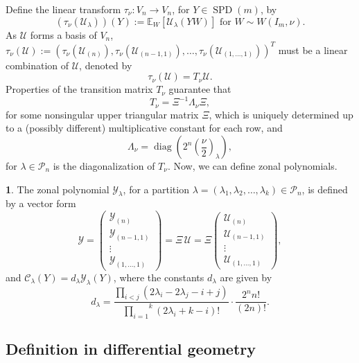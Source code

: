 \documentclass[10pt,oneside,american]{amsart}
\numberwithin{equation}{section}
\numberwithin{figure}{section}
\theoremstyle{plain}
\theoremstyle{definition}
\newtheorem{defn}[thm]{\protect\definitionname}
\theoremstyle{remark}
\theoremstyle{plain}
\theoremstyle{definition}
\theoremstyle{plain}
\theoremstyle{plain}
\DeclareMathOperator{\diag}{diag}
\newcommand{\SPD}{\operatorname{SPD}}
\providecommand{\definitionname}{Definition}
\begin{document}
Define the linear transform $\tau_{\nu}\colon V_{n}\longrightarrow V_{n}$,
for $Y\in \SPD(m)$, by
\[
  \left(\tau_{\nu}(\mathcal{U}_{\lambda})\right)\left(Y\right) :=
  \mathbb{E}_{W}\left[\mathcal{U}_{\lambda}(YW)\right]\text{ for }W\sim W(I_m,\nu).
\]
As $\mathcal{U}$ forms a basis of $V_{n}$, $\tau_{\nu}(\mathcal{U}):=\left(\tau_{\nu}(\mathcal{U}_{\left(n\right)}),\tau_{\nu}(\mathcal{U}_{\left(n-1,1\right)}),\ldots,\tau_{\nu}(\mathcal{U}_{\left(1,\ldots,1\right)})\right)^{T}$
must be a linear combination of $\mathcal{U}$,
denoted by 
\[
\tau_{\nu}(\mathcal{U})=T_{\nu}\mathcal{U}.
\]
Properties of the transition matrix $T_{\nu}$ guarantee that
\[
T_{\nu}=\Xi^{-1}\Lambda_{\nu}\Xi,
\]
for some nonsingular upper triangular matrix $\Xi$, which is uniquely
determined up to a (possibly different) multiplicative constant for
each row, and 
\[
\Lambda_{\nu}=\diag\left(2^{n}\left(\frac{\nu}{2}\right)_\lambda\right),
\]
for $\lambda\in\mathcal{P}_n$ is the diagonalization of $T_\nu$.
Now, we can define zonal polynomials.
\begin{defn}
The zonal polynomial $\mathcal{Y}_{\lambda}$, for a partition $\lambda=\left(\lambda_1,\lambda_2,\ldots,\lambda_k\right)\in\mathcal{P}_{n}$,
is defined by a vector form
\[
\mathcal{Y}=\left(\begin{matrix}\mathcal{Y}_{\left(n\right)}\\
\mathcal{Y}_{\left(n-1,1\right)}\\
\vdots\\
\mathcal{Y}_{\left(1,\ldots,1\right)}
\end{matrix}\right)=\Xi\,\mathcal{U}=\Xi\left(\begin{matrix}\mathcal{U}_{\left(n\right)}\\
\mathcal{U}_{\left(n-1,1\right)}\\
\vdots\\
\mathcal{U}_{\left(1,\ldots,1\right)}
\end{matrix}\right),
\]
and $\mathcal{C}_{\lambda}(Y)=d_{\lambda}\mathcal{Y}_{\lambda}(Y)$,
where the constants $d_\lambda$ are given by
\[
  d_{\lambda}=\frac{\underset{i<j}{\prod}\left(2\lambda_{i}-2\lambda_{j}-i+j\right)}{\overset{k}{\underset{i=1}{\prod}}\left(2\lambda_{i}+k-i\right)!}
  \cdot\frac{2^{n}n!}{\left(2n\right)!}.
\]
\end{defn}

\subsection{Definition in differential geometry}
\end{document}
